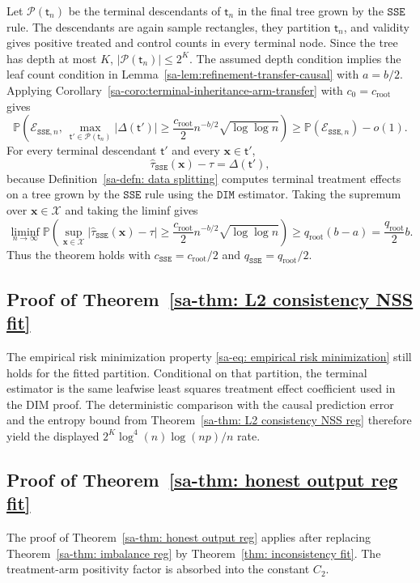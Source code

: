 \documentclass[10pt]{article}
\def\nodet{\mathsf{t}}
\def\bx{\mathbf{x}}
\def\X{\mathcal{X}}
\def\P{\mathbb{P}}
\def\DIM{\mathtt{DIM}}
\def\SSE{\mathtt{SSE}}
\theoremstyle{definition}
\theoremstyle{remark}
\begin{document}
Let $\mathcal P(\nodet_n)$ be the terminal descendants of $\nodet_n$ in the
final tree grown by the $\SSE$ rule. The descendants are again sample
rectangles, they partition $\nodet_n$, and validity gives positive treated and
control counts in every terminal node. Since the tree has depth at most $K$,
$|\mathcal P(\nodet_n)|\leq 2^K$. The assumed depth condition implies the leaf
count condition in Lemma~\ref{sa-lem:refinement-transfer-causal} with
$a=b/2$. Applying Corollary~\ref{sa-coro:terminal-inheritance-arm-transfer}
with $c_0=c_{\mathrm{root}}$ gives
\[
    \P\left(
        \mathcal E_{\SSE,n},\
        \max_{\nodet'\in\mathcal P(\nodet_n)}
        |\Delta(\nodet')|
        \geq
        \frac{c_{\mathrm{root}}}{2}n^{-b/2}\sqrt{\log\log n}
    \right)
    \geq
    \P(\mathcal E_{\SSE,n})-o(1).
\]
For every terminal descendant $\nodet'$ and every $\bx\in\nodet'$,
\[
    \hat\tau_{\SSE}(\bx)-\tau
    =
    \Delta(\nodet'),
\]
because Definition~\ref{sa-defn: data splitting} computes terminal treatment
effects on a tree grown by the $\SSE$ rule using the $\DIM$ estimator. Taking
the supremum over $\bx\in\X$ and taking the liminf gives
\[
    \liminf_{n\to\infty}
    \P\left(
        \sup_{\bx\in\X}
        |\hat\tau_{\SSE}(\bx)-\tau|
        \geq
        \frac{c_{\mathrm{root}}}{2}n^{-b/2}\sqrt{\log\log n}
    \right)
    \geq
    q_{\mathrm{root}}(b-a)
    =
    \frac{q_{\mathrm{root}}}{2}b.
\]
Thus the theorem holds with $c_{\SSE}=c_{\mathrm{root}}/2$ and
$q_{\SSE}=q_{\mathrm{root}}/2$.

\subsection{Proof of Theorem~\ref{sa-thm: L2 consistency NSS fit}}

The empirical risk minimization property \eqref{sa-eq: empirical risk minimization} still holds for the fitted partition. Conditional on that partition, the terminal estimator is the same leafwise least squares treatment effect coefficient used in the DIM proof. The deterministic comparison with the causal prediction error and the entropy bound from Theorem~\ref{sa-thm: L2 consistency NSS reg} therefore yield the displayed $2^K\log^4(n)\log(np)/n$ rate.

\subsection{Proof of Theorem~\ref{sa-thm: honest output reg fit}}

The proof of Theorem~\ref{sa-thm: honest output reg} applies after replacing Theorem~\ref{sa-thm: imbalance reg} by Theorem~\ref{thm: inconsistency fit}. The treatment-arm positivity factor is absorbed into the constant $C_2$.
\end{document}
